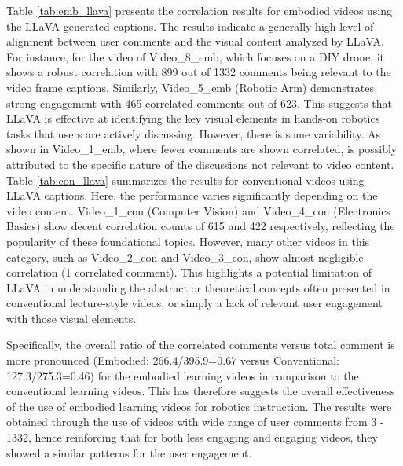 \documentclass[12pt]{article}
\begin{document}
Table \ref{tab:emb_llava} presents the correlation results for embodied videos using the LLaVA-generated captions. The results indicate a generally high level of alignment between user comments and the visual content analyzed by LLaVA. For instance, for the video of Video\_8\_emb, which focuses on a DIY drone, it shows a robust correlation with 899 out of 1332 comments being relevant to the video frame captions. Similarly, Video\_5\_emb (Robotic Arm) demonstrates strong engagement with 465 correlated comments out of 623. This suggests that LLaVA is effective at identifying the key visual elements in hands-on robotics tasks that users are actively discussing. However, there is some variability. As shown in Video\_1\_emb, where fewer comments are shown correlated,  is possibly attributed to the specific nature of the discussions not relevant to video content.
Table \ref{tab:con_llava} summarizes the results for conventional videos using LLaVA captions. Here, the performance varies significantly depending on the video content. Video\_1\_con (Computer Vision) and Video\_4\_con (Electronics Basics) show decent correlation counts of 615 and 422 respectively, reflecting the popularity of these foundational topics. However, many other videos in this category, such as Video\_2\_con and Video\_3\_con, show almost negligible correlation (1 correlated comment). This highlights a potential limitation of LLaVA in understanding the abstract or theoretical concepts often presented in conventional lecture-style videos, or simply a lack of relevant user engagement with those visual elements. 


Specifically, the overall ratio of the correlated comments versus total comment is more pronounced (Embodied: 266.4/395.9=0.67 versus Conventional: 127.3/275.3=0.46) for the embodied learning videos in comparison to the conventional learning videos. This has therefore suggests the overall effectiveness of the use of embodied learning videos for robotics instruction. The results were obtained through the use of videos with wide range of user comments from 3 - 1332, hence reinforcing that for both less engaging and engaging videos, they showed a similar patterns for the user engagement.  
\end{document}
